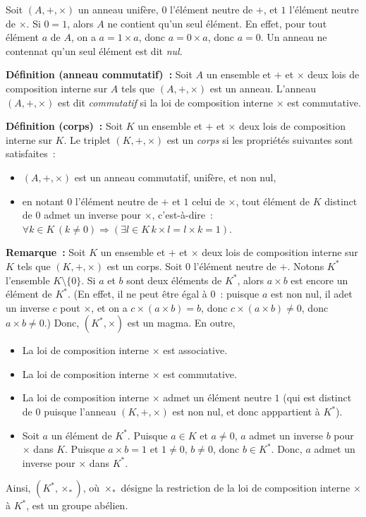 \medskip

Soit $(A, +, \times)$ un anneau unifère, $0$ l'élément neutre de $+$, et $1$ l'élément neutre de $\times$. 
Si $0 = 1$, alors $A$ ne contient qu'un seul élément. 
En effet, pour tout élément $a$ de $A$, on a $a = 1 \times a$, donc $a = 0 \times a$, donc $a = 0$. 
Un anneau ne contennat qu'un seul élément est dit \textit{nul}. 

\medskip

\noindent\textbf{Définition (anneau commutatif) :} Soit $A$ un ensemble et $+$ et $\times$ deux lois de composition interne sur $A$ tels que $(A, +, \times)$ est un anneau. 
    L'anneau $(A, +, \times)$ est dit \textit{commutatif} si la loi de composition interne $\times$ est commutative.

\medskip

\noindent\textbf{Définition (corps) :} Soit $K$ un ensemble et $+$ et $\times$ deux lois de composition interne sur $K$. 
    Le triplet $(K, +, \times)$ est un \textit{corps} si les propriétés suivantes sont satisfaites : 
    \begin{itemize}[nosep]
        \item $(A,+,\times)$ est un anneau commutatif, unifère, et non nul,
        \item en notant $0$ l'élément neutre de $+$ et $1$ celui de $\times$, tout élément de $K$ distinct de $0$ admet un inverse pour $\times$, c'est-à-dire : $\forall k \in K \, (k \neq 0) \Rightarrow (\exists l \in K \, k \times l = l \times k = 1)$.
    \end{itemize}

\medskip

\noindent\textbf{Remarque :} Soit $K$ un ensemble et $+$ et $\times$ deux lois de composition interne sur $K$ tels que $(K, +, \times)$ est un corps. 
    Soit $0$ l'élément neutre de $+$.
    Notons $K^*$ l'ensemble $K \setminus \lbrace 0 \rbrace$.
    Si $a$ et $b$ sont deux éléments de $K^*$, alors $a \times b$ est encore un élément de $K^*$. 
    (En effet, il ne peut être égal à $0$ : puisque $a$ est non nul, il adet un inverse $c$ pout $\times$, et on a $c \times (a \times b) = b$, donc $c \times (a \times b) \neq 0$, donc $a \times b \neq 0$.)
    Donc, $(K^*, \times)$ est un magma.
    En outre, 
    \begin{itemize}[nosep]
        \item La loi de composition interne $\times$ est associative.
        \item La loi de composition interne $\times$ est commutative.
        \item La loi de composition interne $\times$ admet un élément neutre $1$ (qui est distinct de $0$ puisque l'anneau $(K, +, \times)$ est non nul, et donc apppartient à $K^*$).
        \item Soit $a$ un élément de $K^*$. 
            Puisque $a \in K$ et $a \neq 0$, $a$ admet un inverse $b$ pour $\times$ dans $K$.
            Puisque $a \times b = 1$ et $1 \neq 0$, $b \neq 0$, donc $b \in K^*$.
            Donc, $a$ admet un inverse pour $\times$ dans $K^*$.
    \end{itemize}
    Ainsi, $(K^*, \times_*)$, où $\times_*$ désigne la restriction de la loi de composition interne $\times$ à $K^*$, est un groupe abélien.

